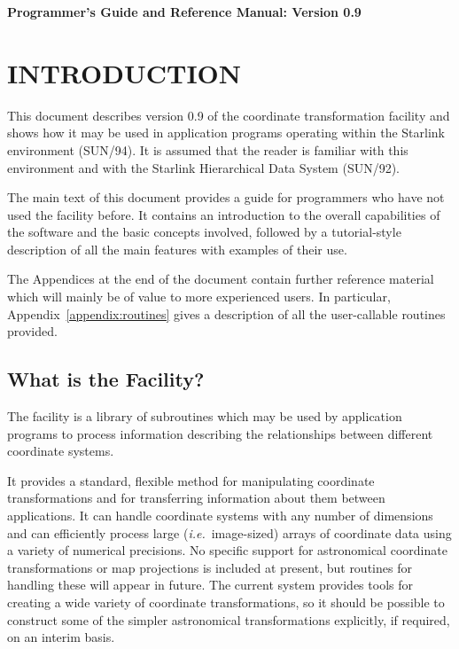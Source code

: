 \begin{center}
{\large\bf Programmer's Guide and Reference Manual: Version 0.9}
\end{center}

\setlength{\parskip}{0mm}
\tableofcontents
\setlength{\parskip}{\medskipamount}
\markright{\stardocname}


\section{INTRODUCTION}

This document describes version 0.9 of the  coordinate
transformation facility and shows how it may be used in application programs
operating within the Starlink  environment (SUN/94). 
It is assumed that the reader is familiar with this environment and with the
Starlink Hierarchical Data System  (SUN/92). 

The main text of this document provides a guide for programmers who have not 
used the  facility before.
It contains an introduction to the overall capabilities of the software and
the basic concepts involved, followed by a tutorial-style description of all
the main features with examples of their use. 

The Appendices at the end of the document contain further reference material
which will mainly be of value to more experienced users.
In particular, Appendix~\ref{appendix:routines} gives a description of all 
the user-callable routines provided.


\subsection{What is the  Facility?}

The  facility is a library of subroutines which may be used
by application programs to process information describing the relationships
between different coordinate systems. 

It provides a standard, flexible method for manipulating coordinate
transformations and for transferring information about them between
applications. 
It can handle coordinate systems with any number of dimensions and can
efficiently process large ({\em i.e.}\ image-sized) arrays of coordinate
data using a variety of numerical precisions. 
No specific support for astronomical coordinate transformations or map
projections is included at present, but routines for handling these will
appear in future.
The current system provides tools for creating a wide variety of coordinate
transformations, so it should be possible to construct some of the simpler
astronomical transformations explicitly, if required, on an interim basis. 

